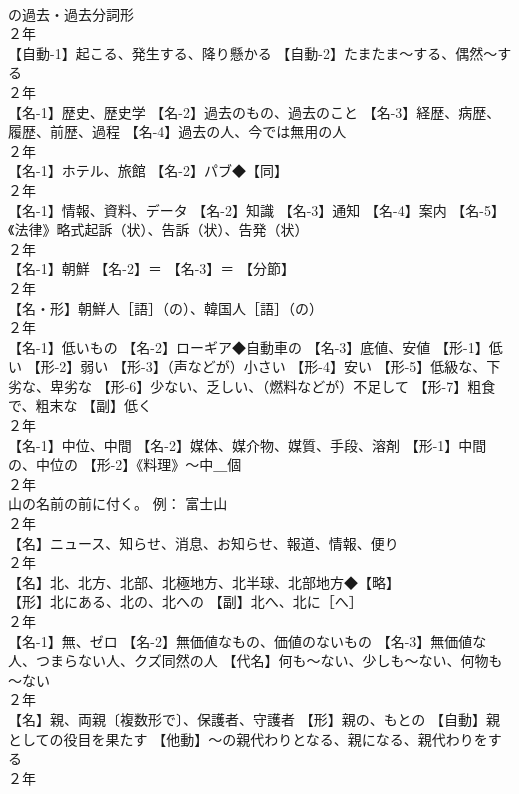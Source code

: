 \documentclass[8pt]{extreport}
\begin{document}
\begin{CJK}{UTF8}{min}
\\	の過去・過去分詞形
\\	２年	
\\	【自動-1】起こる、発生する、降り懸かる 【自動-2】たまたま～する、偶然～する
\\	２年	
\\	【名-1】歴史、歴史学 【名-2】過去のもの、過去のこと 【名-3】経歴、病歴、履歴、前歴、過程 【名-4】過去の人、今では無用の人
\\	２年	
\\	【名-1】ホテル、旅館 【名-2】パブ◆【同】
\\	２年	
\\	【名-1】情報、資料、データ 【名-2】知識 【名-3】通知 【名-4】案内 【名-5】《法律》略式起訴（状）、告訴（状）、告発（状）
\\	２年	
\\	【名-1】朝鮮 【名-2】＝ 【名-3】＝ 【分節】
\\	２年	
\\	【名・形】朝鮮人［語］（の）、韓国人［語］（の）
\\	２年	
\\	【名-1】低いもの 【名-2】ローギア◆自動車の 【名-3】底値、安値 【形-1】低い 【形-2】弱い 【形-3】（声などが）小さい 【形-4】安い 【形-5】低級な、下劣な、卑劣な 【形-6】少ない、乏しい、（燃料などが）不足して 【形-7】粗食で、粗末な 【副】低く
\\	２年	
\\	【名-1】中位、中間 【名-2】媒体、媒介物、媒質、手段、溶剤 【形-1】中間の、中位の 【形-2】《料理》～中＿個
\\	２年	
\\	山の名前の前に付く。 例： 富士山　
\\	２年	
\\	【名】ニュース、知らせ、消息、お知らせ、報道、情報、便り
\\	２年	
\\	【名】北、北方、北部、北極地方、北半球、北部地方◆【略】
\\	【形】北にある、北の、北への 【副】北へ、北に［へ］
\\	２年	
\\	【名-1】無、ゼロ 【名-2】無価値なもの、価値のないもの 【名-3】無価値な人、つまらない人、クズ同然の人 【代名】何も～ない、少しも～ない、何物も～ない
\\	２年	
\\	【名】親、両親〔複数形で〕、保護者、守護者 【形】親の、もとの 【自動】親としての役目を果たす 【他動】～の親代わりとなる、親になる、親代わりをする
\\	２年	

\end{CJK}
\end{document}
